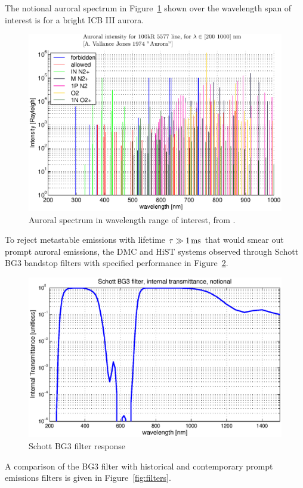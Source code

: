 The notional auroral spectrum in Figure~\ref{fig:VJaurora} shown over the wavelength span of interest is for a bright ICB III aurora.
\begin{figure}
	\includegraphics[width=\textwidth,trim=5 10 5 1,clip]{gfx/AuroralSpectrumLogVJ}
	\caption{Auroral spectrum in wavelength range of interest, from \citet{vallancejones1974}. }\label{fig:VJaurora}
\end{figure}
To reject metastable emissions with lifetime $\tau \gg\unit[1]{ms}$ that would smear out prompt auroral emissions, the DMC and HiST systems observed through Schott BG3 bandstop filters with specified performance in Figure~\ref{fig:BG3trans}. 
\begin{figure}\centering
	\includegraphics[width=\textwidth]{gfx/BG3transLog}
	\caption{Schott BG3 filter response}\label{fig:BG3trans}
\end{figure}
A comparison of the BG3 filter with historical and contemporary prompt emissions filters is given in Figure~\ref{fig:filters}.
